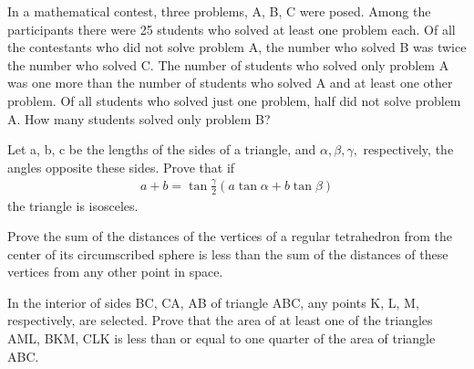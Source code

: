 \item In a mathematical contest, three problems, A, B, C were posed. Among the participants there were 25 students who solved at least one problem each. Of all the contestants who did not solve problem A, the number who solved B was twice the number who solved C. The number of students who solved only problem A was one more than the number of students who solved A and at least one other problem. Of all students who solved just one problem, half did not solve problem A. How many students solved only problem B?
\item Let a, b, c be the lengths of the sides of a triangle, and $\alpha, \beta, \gamma,$ respectively, the angles opposite these sides. Prove that if
\begin{align*}
a + b = \tan\frac{\gamma}{2}(a\tan\alpha + b\tan{\beta})
\end{align*}
the triangle is isosceles.
\item Prove the sum of the distances of the vertices of a regular tetrahedron from
the center of its circumscribed sphere is less than the sum of the distances of
these vertices from any other point in space.
\item In the interior of sides BC, CA, AB of triangle ABC, any points K, L, M, respectively, are selected. Prove that the area of at least one of the triangles AML, BKM, CLK is less than or equal to one quarter of the area of triangle ABC.



